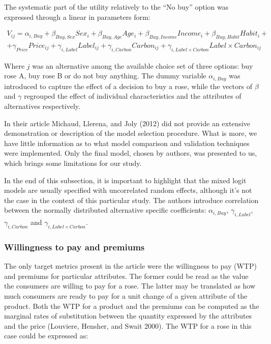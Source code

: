 \documentclass[12pt,]{article}
\begin{document}
The systematic part of the utility relatively to the ``No buy'' option
was expressed through a linear in parameters form:

\begin{multline}
V_{ij} = \alpha_{i,Buy} + \beta_{Buy, Sex} Sex_i + \beta_{Buy, Age} Age_i + \beta_{Buy, Income} Income_i + \beta_{Buy, Habit} Habit_i + \\
+ \gamma_{Price} Price_{ij} + \gamma_{i, Label} Label_{ij} + \gamma_{i, Carbon} Carbon_{ij} + \gamma_{i, Label \times Carbon} Label \times Carbon_{ij}
\end{multline}

Where \(j\) was an alternative among the available choice set of three
options: buy rose A, buy rose B or do not buy anything. The dummy
variable \(\alpha_{i,Buy}\) was introduced to capture the effect of a
decision to buy a rose, while the vectors of \(\beta\) and \(\gamma\)
regrouped the effect of individual characteristics and the attributes of
alternatives respectively.

In their article Michaud, Llerena, and Joly (2012) did not provide an
extensive demonstration or description of the model selection procedure.
What is more, we have little information as to what model comparison and
validation techniques were implemented. Only the final model, chosen by
authors, was presented to us, which brings some limitations for our
study.

In the end of this subsection, it is important to highlight that the
mixed logit models are usually specified with uncorrelated random
effects, although it's not the case in the context of this particular
study. The authors introduce correlation between the normally
distributed alternative specific coefficients: \(\alpha_{i,Buy}\),
\(\gamma_{i, Label}\), \(\gamma_{i, Carbon}\) and
\(\gamma_{i, Label \times Carbon}\).

\hypertarget{willingness-to-pay-and-premiums}{%
\subsubsection{Willingness to pay and
premiums}\label{willingness-to-pay-and-premiums}}

The only target metrics present in the article were the willingness to
pay (WTP) and premiums for particular attributes. The former could be
read as the value the consumers are willing to pay for a rose. The
latter may be translated as how much consumers are ready to pay for a
unit change of a given attribute of the product. Both the WTP for a
product and the premiums can be computed as the marginal rates of
substitution between the quantity expressed by the attributes and the
price (Louviere, Hensher, and Swait 2000). The WTP for a rose in this
case could be expressed as:
\end{document}
